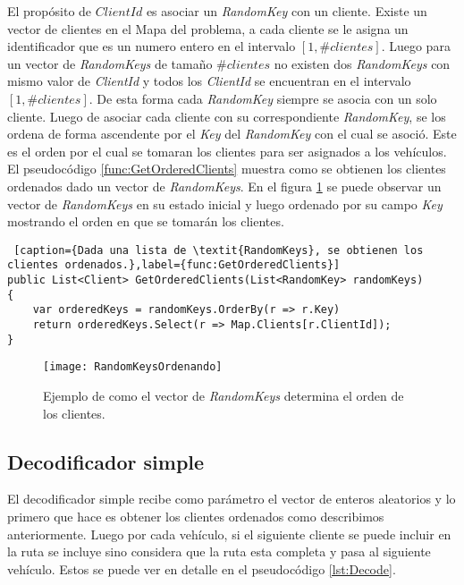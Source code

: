 El propósito de $ClientId$ es asociar un \textit{RandomKey} con un cliente. Existe un vector de clientes en el Mapa del problema, a cada cliente se le asigna un identificador que es un numero entero en el intervalo $[1, \#clientes]$. Luego para un vector de \textit{RandomKeys} de tamaño $\#clientes$ no existen dos \textit{RandomKeys} con mismo valor de \textit{ClientId} y todos los \textit{ClientId} se encuentran en el intervalo $[1, \#clientes]$. De esta forma cada \textit{RandomKey} siempre se asocia con un solo cliente. Luego de asociar cada cliente con su correspondiente \textit{RandomKey}, se los ordena de forma ascendente por el \textit{Key} del \textit{RandomKey} con el cual se asoció. Este es el orden por el cual se tomaran los clientes para ser asignados a los vehículos. El pseudocódigo \ref{func:GetOrderedClients} muestra como se obtienen los clientes ordenados dado un vector de \textit{RandomKeys}. En el figura \ref{fig:RandomKeysOrdenando} se puede observar un vector de \textit{RandomKeys} en su estado inicial y luego ordenado por su campo \textit{Key} mostrando el orden en que se tomarán los clientes.

\bigskip

\begin{minipage}{\linewidth}
\begin{lstlisting} [caption={Dada una lista de \textit{RandomKeys}, se obtienen los clientes ordenados.},label={func:GetOrderedClients}]
public List<Client> GetOrderedClients(List<RandomKey> randomKeys)
{        
	var orderedKeys = randomKeys.OrderBy(r => r.Key)
	return orderedKeys.Select(r => Map.Clients[r.ClientId]);
}
\end{lstlisting}
\end{minipage}

\begin{figure}[h]
	\caption{Ejemplo de como el vector de \textit{RandomKeys} determina el orden de los clientes.}
	\centering
	\texttt{[image: RandomKeysOrdenando]}
	\label{fig:RandomKeysOrdenando}
\end{figure}

\subsection{Decodificador simple}

El decodificador simple recibe como parámetro el vector de enteros aleatorios y lo primero que hace es obtener los clientes ordenados como describimos anteriormente. Luego por cada vehículo, si el siguiente cliente se puede incluir en la ruta se incluye sino considera que la ruta esta completa y pasa al siguiente vehículo. Estos se puede ver en detalle en el pseudocódigo \ref{lst:Decode}. 

